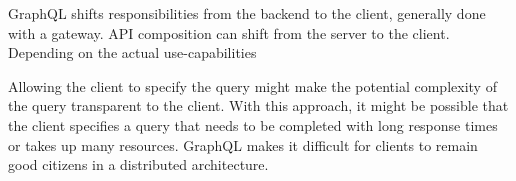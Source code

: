 \bigskip

\noindent GraphQL shifts responsibilities from the backend to the client, generally done with a gateway. \ac{API} composition can shift from the server to the client. Depending on the actual use-capabilities

\bigskip

\noindent Allowing the client to specify the query might make the potential complexity of the query transparent to the client. With this approach, it might be possible that the client specifies a query that needs to be completed with long response times or takes up many resources. GraphQL makes it difficult for clients to remain good citizens in a distributed architecture. \cite{book:2018:richardson:background:bff:microservices-patterns}





